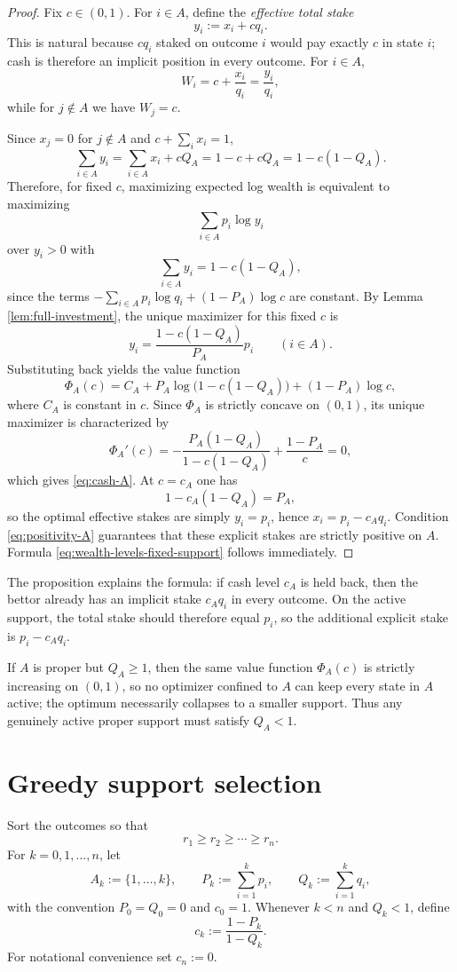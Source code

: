 \documentclass[11pt]{article}
\begin{document}
\begin{proof}
Fix $c\in(0,1)$. For $i\in A$, define the \emph{effective total stake}
\[
  y_i:=x_i+cq_i.
\]
This is natural because $cq_i$ staked on outcome $i$ would pay exactly $c$ in state $i$; cash is therefore an implicit position in every outcome. For $i\in A$,
\[
  W_i=c+\frac{x_i}{q_i}=\frac{y_i}{q_i},
\]
while for $j\notin A$ we have $W_j=c$.

Since $x_j=0$ for $j\notin A$ and $c+\sum_i x_i=1$,
\[
  \sum_{i\in A} y_i
  =\sum_{i\in A} x_i+cQ_A
  =1-c+cQ_A
  =1-c(1-Q_A).
\]
Therefore, for fixed $c$, maximizing expected log wealth is equivalent to maximizing
\[
  \sum_{i\in A} p_i\log y_i
\]
over $y_i>0$ with
\[
  \sum_{i\in A} y_i=1-c(1-Q_A),
\]
since the terms $-\sum_{i\in A} p_i\log q_i +(1-P_A)\log c$ are constant. By Lemma \ref{lem:full-investment}, the unique maximizer for this fixed $c$ is
\[
  y_i=\frac{1-c(1-Q_A)}{P_A}p_i \qquad (i\in A).
\]
Substituting back yields the value function
\[
  \Phi_A(c)=C_A+P_A\log\!\bigl(1-c(1-Q_A)\bigr)+(1-P_A)\log c,
\]
where $C_A$ is constant in $c$. Since $\Phi_A$ is strictly concave on $(0,1)$, its unique maximizer is characterized by
\[
  \Phi_A'(c)= -\frac{P_A(1-Q_A)}{1-c(1-Q_A)}+\frac{1-P_A}{c}=0,
\]
which gives \eqref{eq:cash-A}. At $c=c_A$ one has
\[
  1-c_A(1-Q_A)=P_A,
\]
so the optimal effective stakes are simply $y_i=p_i$, hence $x_i=p_i-c_Aq_i$. Condition \eqref{eq:positivity-A} guarantees that these explicit stakes are strictly positive on $A$. Formula \eqref{eq:wealth-levels-fixed-support} follows immediately.
\end{proof}

The proposition explains the formula: if cash level $c_A$ is held back, then the bettor already has an implicit stake $c_Aq_i$ in every outcome. On the active support, the total stake should therefore equal $p_i$, so the additional explicit stake is $p_i-c_Aq_i$.

If $A$ is proper but $Q_A\ge 1$, then the same value function $\Phi_A(c)$ is strictly increasing on $(0,1)$, so no optimizer confined to $A$ can keep every state in $A$ active; the optimum necessarily collapses to a smaller support. Thus any genuinely active proper support must satisfy $Q_A<1$.

\section{Greedy support selection}
Sort the outcomes so that
\[
  r_1\ge r_2\ge \cdots \ge r_n.
\]
For $k=0,1,\dots,n$, let
\[
  A_k:=\{1,\dots,k\},
  \qquad P_k:=\sum_{i=1}^k p_i,
  \qquad Q_k:=\sum_{i=1}^k q_i,
\]
with the convention $P_0=Q_0=0$ and $c_0=1$. Whenever $k<n$ and $Q_k<1$, define
\[
  c_k:=\frac{1-P_k}{1-Q_k}.
\]
For notational convenience set $c_n:=0$.
\end{document}
